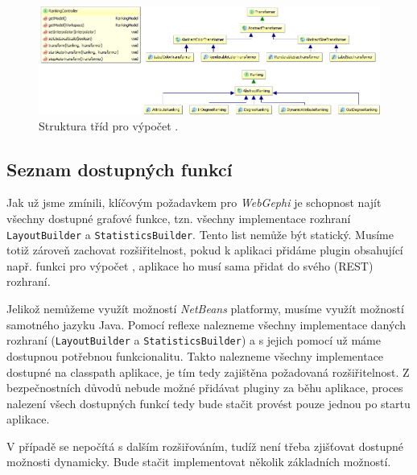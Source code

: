 \documentclass[thesis=M,czech]{FITthesis}[2014/05/6]
\begin{document}
\begin{figure}\centering
 	\includegraphics[width=1\textwidth]{images/class-diagram/ranking}
 	\caption[Struktura tříd pro výpočet ]{Struktura tříd pro výpočet .}\label{fig:uml-ranking}
\end{figure}



\subsection{Seznam dostupných funkcí}
Jak už jsme zmínili, klíčovým požadavkem pro \textit{WebGephi} je schopnost najít všechny dostupné grafové funkce, tzn. všechny implementace
rozhraní \texttt{Layout\-Builder} a \texttt{Statistics\-Builder}. Tento list nemůže být statický. Musíme totiž zároveň zachovat rozšiřitelnost, 
pokud k aplikaci přidáme plugin obsahující např. funkci pro výpočet , aplikace ho musí sama přidat do svého (REST) rozhraní.

Jelikož nemůžeme využít možností \textit{NetBeans} platformy, musíme využít možností samotného jazyku Java. Pomocí reflexe nalezneme všechny
implementace daných rozhraní (\texttt{LayoutBuilder} a \texttt{StatisticsBuilder}) a s jejich pomocí už máme dostupnou potřebnou funkcionalitu.
Takto nalezneme všechny implementace dostupné na classpath aplikace, je tím tedy zajištěna požadovaná rozšiřitelnost. Z bezpečnostních důvodů
nebude možné přidávat pluginy za běhu aplikace, proces nalezení všech dostupných funkcí tedy bude stačit provést pouze jednou po startu aplikace.

V případě  se nepočítá s dalším rozšiřováním, tudíž není třeba zjišťovat dostupné možnosti dynamicky. Bude stačit implementovat několik základních možností.
 
\end{document}
